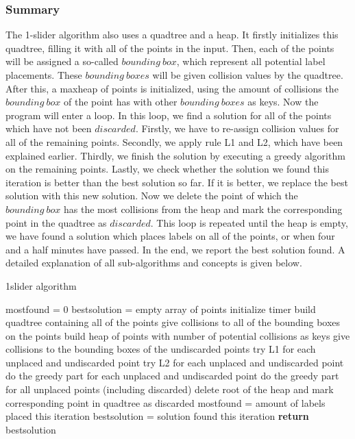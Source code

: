 \documentclass[crop=false,a4paper,oneside,11pt]{article}
\begin{document}
\subsubsection{Summary}
The 1-slider algorithm also uses a quadtree and a heap. It firstly initializes this quadtree, filling it with all of the points in the input. Then, each of the points will be assigned a so-called $bounding\ box$, which represent all potential label placements. These $bounding \ boxes$ will be given collision values by the quadtree. After this, a maxheap of points is initialized, using the amount of collisions the $bounding \ box$ of the point has with other $bounding \ boxes$ as keys. Now the program will enter a loop. In this loop, we find a solution for all of the points which have not been $discarded$. Firstly, we have to re-assign collision values for all of the remaining points. Secondly, we apply rule L1 and L2, which have been explained earlier. Thirdly, we finish the solution by executing a greedy algorithm on the remaining points. Lastly, we check whether the solution we found this iteration is better than the best solution so far. If it is better, we replace the best solution with this new solution. Now we delete the point of which the $bounding \ box$ has the most collisions from the heap and mark the corresponding point in the quadtree as $discarded$. This loop is repeated until the heap is empty, we have found a solution which places labels on all of the points, or when four and a half minutes have passed. In the end, we report the best solution found. A detailed explanation of all sub-algorithms and concepts is given below. \\
 \begin{algorithm}[H]
\caption{1slider algorithm}
\begin{algorithmic}[1]
\State mostfound = 0
\State bestsolution = empty array of points
\State initialize timer
\State build quadtree containing all of the points
\State give collisions to all of the bounding boxes on the points
\State build heap of points with number of potential collisions as keys
\State give collisions to the bounding boxes of the undiscarded points
\State try L1 for each unplaced and undiscarded point
\State try L2 for each unplaced and undiscarded point
\State do the greedy part for each unplaced and undiscarded point
\State do the greedy part for all unplaced points (including discarded)
\State delete root of the heap and mark corresponding point in quadtree as discarded
\State mostfound = amount of labels placed this iteration
\State bestsolution = solution found this iteration
\EndIf
\EndWhile
\State \textbf{return} bestsolution
\EndProcedure
\end{algorithmic}
\end{algorithm}
\end{document}

